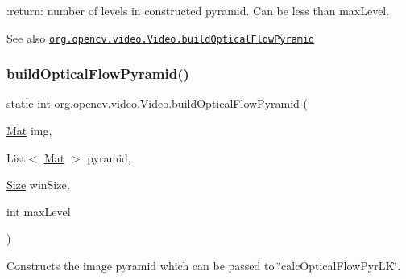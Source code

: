 \+:return\+: number of levels in constructed pyramid. Can be less than {\ttfamily max\+Level}.

\begin{DoxySeeAlso}{See also}
\href{http://docs.opencv.org/modules/video/doc/motion_analysis_and_object_tracking.html#buildopticalflowpyramid}{\tt org.\+opencv.\+video.\+Video.\+build\+Optical\+Flow\+Pyramid} 
\end{DoxySeeAlso}
\mbox{\label{classorg_1_1opencv_1_1video_1_1_video_ac702001e72ad8f8b5b8ae410e50da9f8}} 
\subsubsection{\texorpdfstring{build\+Optical\+Flow\+Pyramid()}{buildOpticalFlowPyramid()}\hspace{0.1cm}{\footnotesize\ttfamily [2/2]}}
{\footnotesize\ttfamily static int org.\+opencv.\+video.\+Video.\+build\+Optical\+Flow\+Pyramid (\begin{DoxyParamCaption}\item[{\mbox{\hyperlink{classorg_1_1opencv_1_1core_1_1_mat}{Mat}}}]{img,  }\item[{List$<$ \mbox{\hyperlink{classorg_1_1opencv_1_1core_1_1_mat}{Mat}} $>$}]{pyramid,  }\item[{\mbox{\hyperlink{classorg_1_1opencv_1_1core_1_1_size}{Size}}}]{win\+Size,  }\item[{int}]{max\+Level }\end{DoxyParamCaption})\hspace{0.3cm}{\ttfamily [static]}}

Constructs the image pyramid which can be passed to \char`\"{}calc\+Optical\+Flow\+Pyr\+L\+K\char`\"{}.


